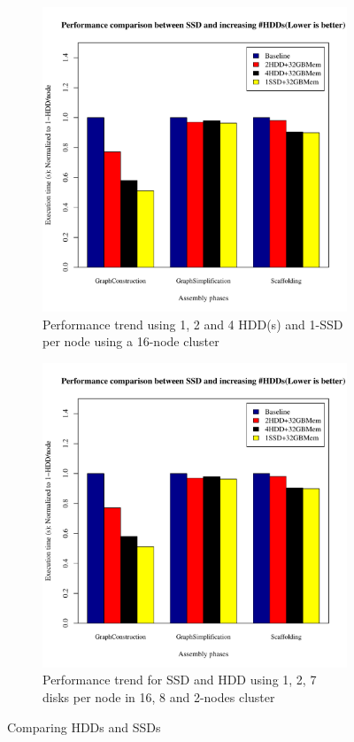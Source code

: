 \documentclass[conference]{IEEEtran}
\begin{document}
\begin{figure}[h]
  \centering
  \begin{subfigure}[b]{0.23\textwidth}
          \includegraphics[width=\textwidth]{Figure/PerormanceData/Plots/SSD4HDD.pdf}
          \caption{Performance trend using 1, 2 and 4 HDD(s) and 1-SSD per node using a 16-node cluster}
          \label{fig:SsdN4Hdd}
  \end{subfigure}
  \begin{subfigure}[b]{0.23\textwidth}
          \includegraphics[width=\textwidth]{Figure/PerormanceData/Plots/SSD4HDD.pdf}
          \caption{Performance trend for SSD and HDD using 1, 2, 7 disks per node in 16, 8 and 2-nodes cluster}
          \label{fig:SsdNHddDiffNodes}
  \end{subfigure}
  \caption{Comparing HDDs and SSDs}
  \label{fig:SsdNHdd}
\end{figure}
\end{document}
